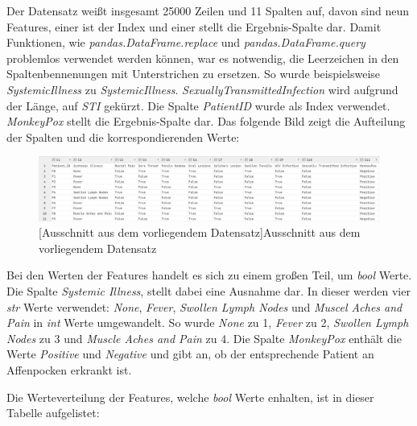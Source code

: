 \documentclass[13pt,a4paper, listof=entryprefix, bibliography=totocnumbered,toc=listofnumbered,lof=listofnumbered]{scrartcl}
\begin{document}
Der Datensatz weißt insgesamt 25000 Zeilen und 11 Spalten auf, davon sind 
neun Features, einer ist der Index und einer stellt die Ergebnis-Spalte dar. Damit Funktionen, wie \textit{pandas.DataFrame.replace} und 
\textit{pandas.DataFrame.query} problemlos verwendet werden können, war es notwendig, die Leerzeichen in den Spaltenbennenungen mit Unterstrichen zu ersetzen. 
So wurde beispielsweise \textit{Systemic\textunderscore Illness} zu \textit{Systemic\textunderscore Illness}. \textit{Sexually\textunderscore Transmitted\textunderscore Infection} wird aufgrund der Länge, auf
\textit{STI} gekürzt. Die Spalte \textit{Patient\textunderscore ID} wurde als Index verwendet. 
\textit{MonkeyPox} stellt die Ergebnis-Spalte dar. Das folgende Bild zeigt die Aufteilung der Spalten und die korrespondierenden Werte:

	\begin{figure}[H]
		\centering
		\includegraphics[width=0.8\linewidth]{Bilder/data_table.png}
		[Ausschnitt aus dem vorliegendem Datensatz]{Ausschnitt aus dem vorliegendem Datensatz}
		\label{fig:data_table}
	\end{figure}

Bei den Werten der Features handelt es sich zu einem großen Teil, um \textit{bool} Werte. Die Spalte \textit{Systemic Illness}, stellt dabei eine Ausnahme dar. In dieser werden
vier \textit{str} Werte verwendet: \textit{None}, \textit{Fever}, \textit{Swollen Lymph Nodes} und \textit{Muscel Aches and Pain} in \textit{int} Werte umgewandelt. So wurde \textit{None} zu 1,
\textit{Fever} zu 2, \textit{Swollen Lymph Nodes} zu 3 und \textit{Muscle Aches and Pain} zu 4. Die Spalte \textit{MonkeyPox} enthält die Werte \textit{Positive} und \textit{Negative} und gibt
an, ob der entsprechende Patient an Affenpocken erkrankt ist.

Die Werteverteilung der Features, welche \textit{bool} Werte enhalten, ist in dieser Tabelle aufgelistet: 
	
\end{document}
